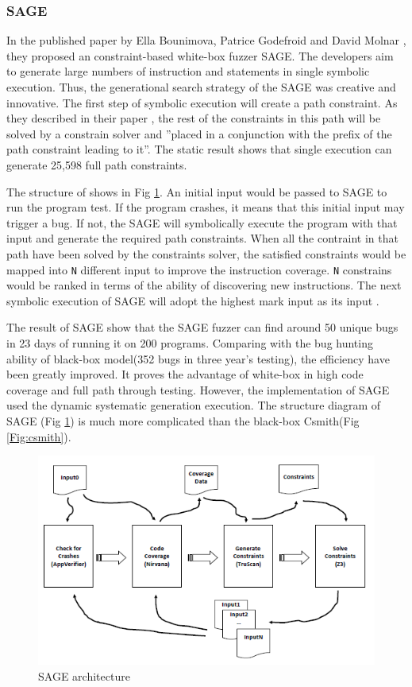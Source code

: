 \subsubsection{SAGE}
In the published paper by Ella Bounimova, Patrice Godefroid and David Molnar \cite{bounimova2013billions}, they proposed an constraint-based white-box fuzzer SAGE. The developers aim to generate large numbers of instruction and statements in single symbolic execution. Thus, the generational search strategy of the SAGE was creative and innovative. The first step of symbolic execution will create a path constraint. As they described in their paper \cite{bounimova2013billions}, the rest of the constraints in this path will be solved by a constrain solver and ''placed in a conjunction with the prefix of the path constraint leading to it''. The static result shows that single execution can generate 25,598 full path constraints.

The structure of shows in Fig \ref{Fig:sage}. An initial input would be passed to SAGE to run the program test. If the program crashes, it means that this initial input may trigger a bug. If not, the SAGE will symbolically execute the program with that input and generate the required path constraints. When all the contraint in that path have been solved by the constraints solver, the satisfied constraints would be mapped into \texttt{N} different input to improve the instruction coverage. \texttt{N} constrains would be ranked in terms of the ability of discovering new instructions. The next symbolic execution of SAGE will adopt the highest mark input as its input \cite{bounimova2013billions}.

The result of SAGE show that the SAGE fuzzer can find around 50 unique bugs in 23 days of running it on 200 programs. Comparing with the bug hunting ability of black-box model(352 bugs in three year's testing), the efficiency have been greatly improved. It proves the advantage of white-box in high code coverage and full path through testing. However, the implementation of SAGE used the dynamic systematic generation execution. The structure diagram of SAGE (Fig \ref{Fig:sage}) is much more complicated than the black-box Csmith(Fig \ref{Fig:csmith}). 
\begin{figure}[htb]
\centering
\includegraphics[scale=0.8]{MScThesisTemplate/Figs/sage.PNG}
\caption{SAGE architecture\cite{bounimova2013billions}}
\label{Fig:sage}
\end{figure}

